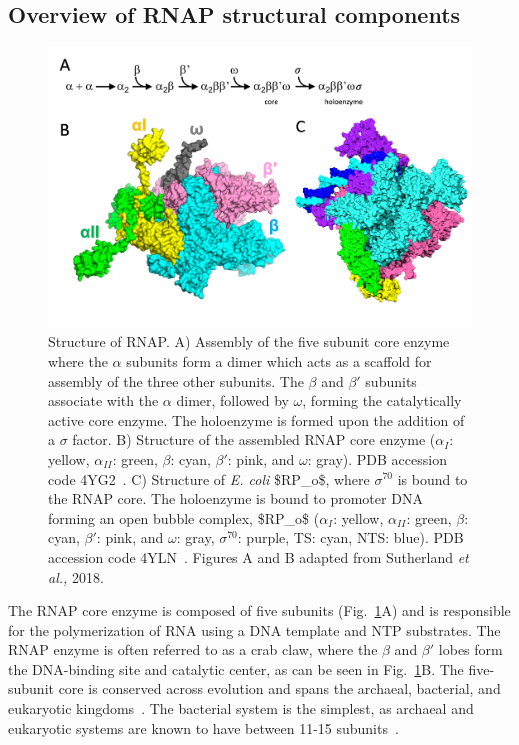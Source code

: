 \subsection{Overview of RNAP structural components}
\label{sec:RNAP_structure}

\begin{figure}
    \centering
    \includegraphics[width=\textwidth]{chapters/figures/RNAP_structure.jpg}
    \caption{\label{fig:RNAP_structure} Structure of RNAP. 
    A) Assembly of the five subunit core enzyme where the $\alpha$ subunits form a dimer which acts as a scaffold for assembly of the three other subunits. 
    The $\beta$ and $\beta'$ subunits associate with the $\alpha$ dimer, followed by $\omega$, forming the catalytically active core enzyme.
    The holoenzyme is formed upon the addition of a $\sigma$ factor.
    B) Structure of the assembled RNAP core enzyme ($\alpha_I$: yellow, $\alpha_{II}$: green, $\beta$: cyan, $\beta'$: pink, and $\omega$: gray). 
    \ac{PDB} accession code 4YG2~\cite{murakami_JBC_2013}.
    C) Structure of \textit{\ac{E. coli}} \ac{$RP_o$}, where $\sigma^{70}$ is bound to the RNAP core.
    The holoenzyme is bound to promoter DNA forming an open bubble complex, \ac{$RP_o$} ($\alpha_I$: yellow, $\alpha_{II}$: green, $\beta$: cyan, $\beta'$: pink, and $\omega$: gray, $\sigma^{70}$: purple, \ac{TS}: cyan, \ac{NTS}: blue).
    \ac{PDB} accession code 4YLN~\cite{zuo_steitz_2015}.
    Figures A and B adapted from Sutherland \textit{et al.,} 2018.~\cite{sutherland_2018}}
\end{figure}

The RNAP core enzyme is composed of five subunits (Fig.~\ref{fig:RNAP_structure}A) and is responsible for the polymerization of RNA using a DNA template and \ac{NTP} substrates.
The RNAP enzyme is often referred to as a crab claw, where the $\beta$ and $\beta'$ lobes form the DNA-binding site and catalytic center, as can be seen in Fig.~\ref{fig:RNAP_structure}B.
The five-subunit core is conserved across evolution and spans the archaeal, bacterial, and eukaryotic kingdoms~\cite{murakami_JBC_2013}.
The bacterial system is the simplest, as archaeal and eukaryotic systems are known to have between 11-15 subunits~\cite{werner_2011}. 

